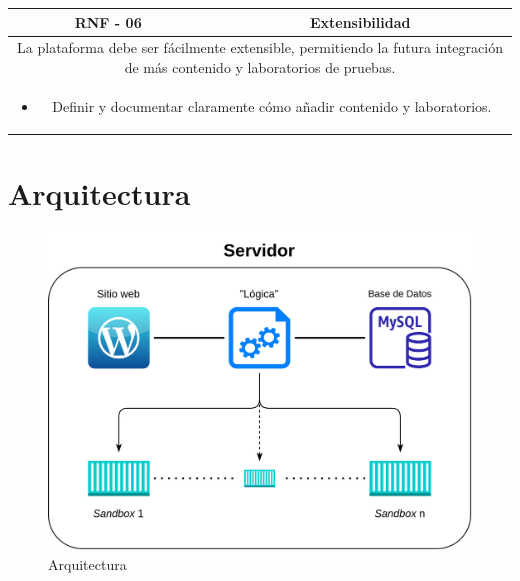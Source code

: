             \begin{table}[H]
                \centering

                \begin{tabular}{|c|c|}
                    \hline
                    \textbf{RNF - 06} & \textbf{Extensibilidad} \\
                    \hline
                    \multicolumn{2}{|p{15cm}|}{
                        La plataforma debe ser fácilmente extensible, permitiendo la futura integración de más contenido y laboratorios de pruebas.
                    } \\
                    \hline
                    \multicolumn{2}{|p{15cm}|}{
                        \begin{itemize}
                            \item Definir y documentar claramente cómo añadir contenido y laboratorios.
                        \end{itemize}
                        } \\
                    \hline
                \end{tabular}

                \label{tab:RNF6}
            \end{table}
            
            \newpage
    
    \section{Arquitectura}
        \label{sec:arquitectura}
        
        \begin{figure}[h]
            \centering

            \includegraphics[scale=0.20]{images/Diagramas/Arquitectura.png}

            \caption{Arquitectura}
            \label{fig:arquitectura}
        \end{figure}

